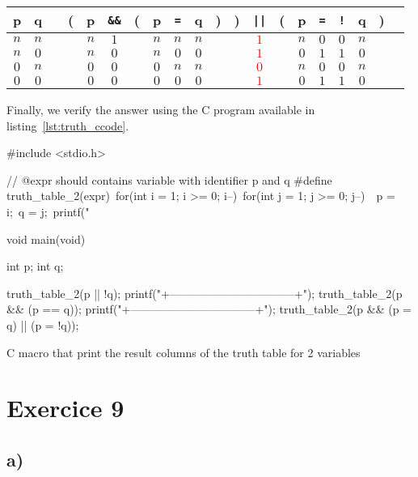 \documentclass[a4paper,11pt]{report}
\begin{document}
\begin{center}
  \begin{tabular}{@{ }c@{ }@{ }c | c@{ }@{}c@{}@{ }c@{ }@{ }c@{ }@{}c@{}@{ }c@{ }@{ }c@{ }@{ }c@{ }@{}c@{}@{}c@{}@{ }c@{ }@{}c@{}@{ }c@{ }@{ }c@{ }@{ }c@{ }@{ }c@{ }@{}c@{}@{ }c}
    p & q &  & ( & p & \verb+&&+ & ( & p & \verb+=+ & q & ) & ) & \verb+||+ & ( & p & \verb+=+ & \verb+!+ & q & ) & \\
    \hline 
    $n$ & $n$ &  &  & $n$ & $1$ &  & $n$ & $n$ & $n$ &  &  & \textcolor{red}{$1$} &  & $n$ & $0$ & $0$ & $n$ &  & \\
    $n$ & $0$ &  &  & $n$ & $0$ &  & $n$ & $0$ & $0$ &  &  & \textcolor{red}{$1$} &  & $0$ & $1$ & $1$ & $0$ &  & \\
    $0$ & $n$ &  &  & $0$ & $0$ &  & $0$ & $n$ & $n$ &  &  & \textcolor{red}{$0$} &  & $n$ & $0$ & $0$ & $n$ &  & \\
    $0$ & $0$ &  &  & $0$ & $0$ &  & $0$ & $0$ & $0$ &  &  & \textcolor{red}{$1$} &  & $0$ & $1$ & $1$ & $0$ &  & \\
  \end{tabular}
\end{center}

Finally, we verify the answer using the C program available in listing~\ref{lst:truth_ccode}.

\begin{listing}[ht]
\centering
\begin{ccode}
#include <stdio.h>

// @expr should contains variable with identifier p and q
#define truth_table_2(expr)\
    for(int i = 1; i >= 0; i--)\
    for(int j = 1; j >= 0; j--)\
    {\
        p = i;\
        q = j;\
        printf("%
    }

void main(void)
{
    int p;
    int q;

    truth_table_2(p || !q);
    printf("+---------------------------------+\n");
    truth_table_2(p && (p == q));
    printf("+---------------------------------+\n");
    truth_table_2(p && (p = q) || (p = !q));
}
\end{ccode}
\caption[]{C macro that print the result columns of the truth table for 2 variables}
\label{lst:truth_ccode}
\end{listing}

\section*{Exercice 9}

\subsection*{a)}
\end{document}
